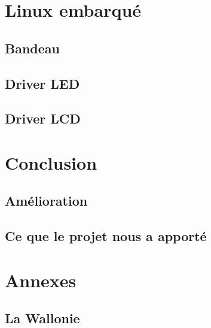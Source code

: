 \documentclass[a4paper,12pt]{article}
\begin{document}
\newpage
\section{Linux embarqué}
  
  \subsection{Bandeau}
  
  \subsection{Driver LED}
  
  \subsection{Driver LCD}

\newpage
\section*{Conclusion}
  
  \subsection*{Amélioration}
  
  \subsection*{Ce que le projet nous a apporté}

\newpage
\section*{Annexes}

  \subsection*{La Wallonie}
\end{document}
